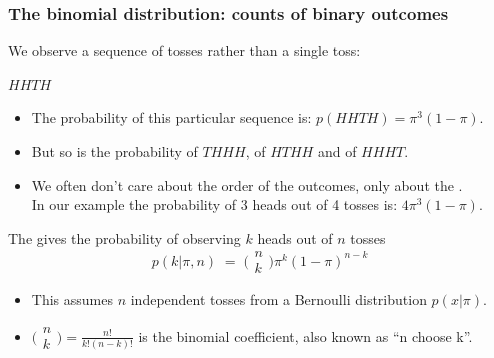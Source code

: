 \begin{frame}
\frametitle{The binomial distribution: counts of binary outcomes}

We observe a sequence of tosses rather than a single toss:
\centerline{$HHTH$}

\begin{itemize}
\item The probability of this particular sequence is:\; $p(HHTH)=\pi^3(1-\pi)$.
\item But so is the probability of $THHH$, of $HTHH$ and of $HHHT$.
\item We often don't care about the order of the outcomes, only about the .\\
In our example the probability of 3 heads out of 4 tosses is:\; $4\pi^3(1-\pi)$.
\end{itemize}

The  gives the probability of
observing $k$ heads out of $n$ tosses
\[
p(k|\pi,n)\;=\; 
\big(\!\!\begin{array}{c}n\\k\end{array}\!\!\big)\pi^k(1-\pi)^{n-k}
\]
\begin{itemize}
\item This assumes $n$ independent tosses from a Bernoulli distribution $p(x|\pi)$.
\item $\big(\!\!\begin{array}{c}n\\k\end{array}\!\!\big)=\frac{n!}{k!(n-k)!}$ is the 
binomial coefficient, also known as ``n choose k''.
\end{itemize}

\end{frame}

